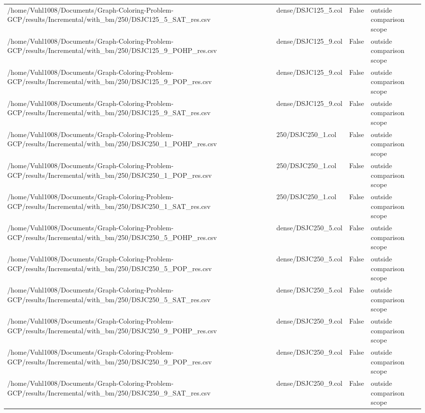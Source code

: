 \begin{table}[htbp]
\begin{tabular}{llll}
/home/Vuhl1008/Documents/Graph-Coloring-Problem-GCP/results/Incremental/with\_bm/250/DSJC125\_5\_SAT\_res.csv & dense/DSJC125\_5.col & False & outside comparison scope \\
/home/Vuhl1008/Documents/Graph-Coloring-Problem-GCP/results/Incremental/with\_bm/250/DSJC125\_9\_POHP\_res.csv & dense/DSJC125\_9.col & False & outside comparison scope \\
/home/Vuhl1008/Documents/Graph-Coloring-Problem-GCP/results/Incremental/with\_bm/250/DSJC125\_9\_POP\_res.csv & dense/DSJC125\_9.col & False & outside comparison scope \\
/home/Vuhl1008/Documents/Graph-Coloring-Problem-GCP/results/Incremental/with\_bm/250/DSJC125\_9\_SAT\_res.csv & dense/DSJC125\_9.col & False & outside comparison scope \\
/home/Vuhl1008/Documents/Graph-Coloring-Problem-GCP/results/Incremental/with\_bm/250/DSJC250\_1\_POHP\_res.csv & 250/DSJC250\_1.col & False & outside comparison scope \\
/home/Vuhl1008/Documents/Graph-Coloring-Problem-GCP/results/Incremental/with\_bm/250/DSJC250\_1\_POP\_res.csv & 250/DSJC250\_1.col & False & outside comparison scope \\
/home/Vuhl1008/Documents/Graph-Coloring-Problem-GCP/results/Incremental/with\_bm/250/DSJC250\_1\_SAT\_res.csv & 250/DSJC250\_1.col & False & outside comparison scope \\
/home/Vuhl1008/Documents/Graph-Coloring-Problem-GCP/results/Incremental/with\_bm/250/DSJC250\_5\_POHP\_res.csv & dense/DSJC250\_5.col & False & outside comparison scope \\
/home/Vuhl1008/Documents/Graph-Coloring-Problem-GCP/results/Incremental/with\_bm/250/DSJC250\_5\_POP\_res.csv & dense/DSJC250\_5.col & False & outside comparison scope \\
/home/Vuhl1008/Documents/Graph-Coloring-Problem-GCP/results/Incremental/with\_bm/250/DSJC250\_5\_SAT\_res.csv & dense/DSJC250\_5.col & False & outside comparison scope \\
/home/Vuhl1008/Documents/Graph-Coloring-Problem-GCP/results/Incremental/with\_bm/250/DSJC250\_9\_POHP\_res.csv & dense/DSJC250\_9.col & False & outside comparison scope \\
/home/Vuhl1008/Documents/Graph-Coloring-Problem-GCP/results/Incremental/with\_bm/250/DSJC250\_9\_POP\_res.csv & dense/DSJC250\_9.col & False & outside comparison scope \\
/home/Vuhl1008/Documents/Graph-Coloring-Problem-GCP/results/Incremental/with\_bm/250/DSJC250\_9\_SAT\_res.csv & dense/DSJC250\_9.col & False & outside comparison scope \\

\end{tabular}
\end{table}
